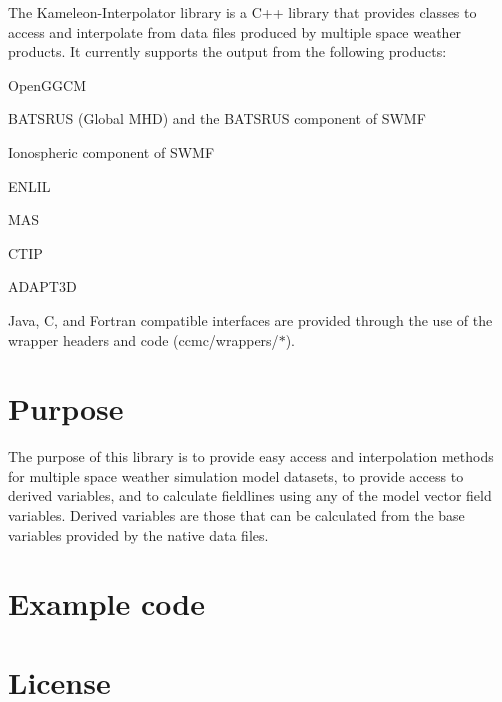 The Kameleon-\/\-Interpolator library is a C++ library that provides classes to access and interpolate from data files produced by multiple space weather products. It currently supports the output from the following products\-:
\begin{DoxyItemize}
\item Open\-G\-G\-C\-M
\item B\-A\-T\-S\-R\-U\-S (Global M\-H\-D) and the B\-A\-T\-S\-R\-U\-S component of S\-W\-M\-F
\item Ionospheric component of S\-W\-M\-F
\item E\-N\-L\-I\-L
\item M\-A\-S
\item C\-T\-I\-P
\item A\-D\-A\-P\-T3\-D
\end{DoxyItemize}

Java, C, and Fortran compatible interfaces are provided through the use of the wrapper headers and code (ccmc/wrappers/$\ast$).\hypertarget{index_Purpose}{}\section{Purpose}\label{index_Purpose}
The purpose of this library is to provide easy access and interpolation methods for multiple space weather simulation model datasets, to provide access to derived variables, and to calculate fieldlines using any of the model vector field variables. Derived variables are those that can be calculated from the base variables provided by the native data files.\hypertarget{index_Examples}{}\section{Example code}\label{index_Examples}
\hypertarget{index_License}{}\section{License}\label{index_License}
